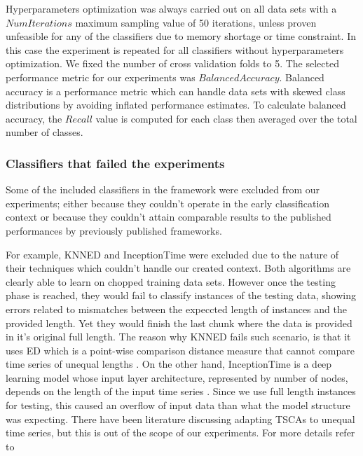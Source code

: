 Hyperparameters optimization was always carried out on all data sets with a $NumIterations$ maximum sampling value of 50 iterations, unless proven unfeasible for any of the classifiers due to memory shortage or time constraint.
In this case the experiment is repeated for all classifiers without hyperparameters optimization. We fixed the number of cross validation folds to 5.
The selected performance metric for our experiments was $Balanced Accuracy$.
Balanced accuracy is a performance metric which can handle data sets with skewed class distributions by avoiding inflated performance estimates.
To calculate balanced accuracy, the $Recall$ value is computed for each class then averaged over the total number of classes.

\subsubsection{Classifiers that failed the experiments}
\label{SubsubsectionExcludedClassifiers}
Some of the included classifiers in the framework were excluded from our experiments; either because they couldn't operate in the early classification context
or because they couldn't attain comparable results to the published performances by previously published frameworks.

For example, KNNED and InceptionTime were excluded due to the nature of their techniques which couldn't handle our created context.
Both algorithms are clearly able to learn on chopped training data sets.
However once the testing phase is reached, they would fail to classify instances of the testing data,
showing errors related to mismatches between the expeccted length of instances and the provided length.
Yet they would finish the last chunk where the data is provided in it's original full length.
The reason why KNNED fails such scenario, is that it uses ED which is a point-wise comparison distance measure that cannot compare time series of unequal lengths \cite{tan2019time}.
On the other hand, InceptionTime is a deep learning model whose input layer architecture, represented by number of nodes, depends on the length of the input time series \cite{fawaz2019deepreview}.
Since we use full length instances for testing, this caused an overflow of input data than what the model structure was expecting.
There have been literature discussing adapting TSCAs to unequal time series, but this is out of the scope of our experiments.
For more details refer to \cite{caiado2009comparison, tan2019time, fawaz2019deepreview}


